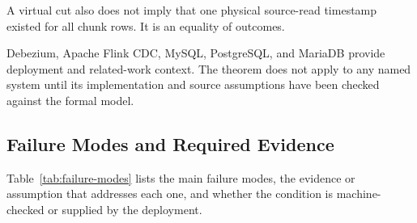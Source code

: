 \documentclass[letterpaper,10pt,twocolumn]{article}
\begin{document}
A virtual cut also does not imply that one physical source-read
timestamp existed for all chunk rows. It is an equality of outcomes.

Debezium, Apache Flink CDC, MySQL, PostgreSQL, and MariaDB provide
deployment and related-work context. The theorem does not apply to any
named system until its implementation and source assumptions have been
checked against the formal model.

\subsection{Failure Modes and Required
Evidence}\label{failure-modes-the-certificate-story-must-expose}

Table~\ref{tab:failure-modes} lists the main failure modes, the evidence
or assumption that addresses each one, and whether the condition is
machine-checked or supplied by the deployment.
\end{document}
